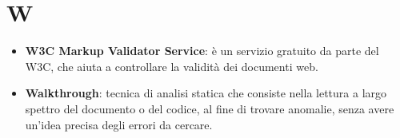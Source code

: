 \section{W}
\begin{itemize}
	\item
	\textbf{W3C Markup Validator Service}: è un servizio gratuito da parte del W3C, che aiuta a controllare la validità dei documenti web.
	\item
	\textbf{Walkthrough}: tecnica di analisi statica che consiste nella 
	lettura a largo spettro del documento o del codice, al fine di trovare anomalie, senza avere un'idea precisa degli errori da cercare.
\end{itemize}